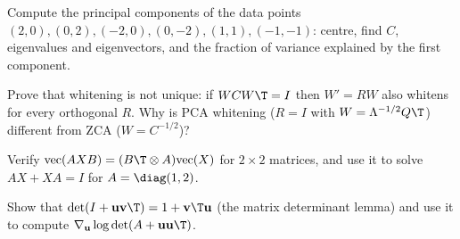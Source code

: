 \begin{exercise}
Compute the principal components of the data points $(2,0),(0,2),(-2,0),(0,-2),(1,1),(-1,-1)$: centre, find $C$, eigenvalues and eigenvectors, and the fraction of variance explained by the first component.
\end{exercise}

\begin{exercise}
Prove that whitening is not unique: if $WCW\T=I$ then $W'=RW$ also whitens for every orthogonal $R$. Why is PCA whitening ($R=I$ with $W=\Lambda^{-1/2}Q\T$) different from ZCA ($W=C^{-1/2}$)?
\end{exercise}

\begin{exercise}
Verify $\mathrm{vec}(AXB)=(B\T\otimes A)\mathrm{vec}(X)$ for $2\times 2$ matrices, and use it to solve $AX+XA=I$ for $A=\diag(1,2)$.
\end{exercise}

\begin{exercise}
Show that $\det(I+\mathbf{u}\mathbf{v}\T)=1+\mathbf{v}\T\mathbf{u}$ (the matrix determinant lemma) and use it to compute $\nabla_{\mathbf{u}}\log\det(A+\mathbf{u}\mathbf{u}\T)$.
\end{exercise}
